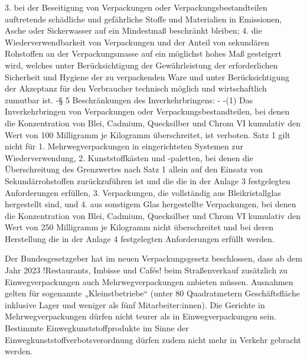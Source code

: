             3. bei der Beseitigung von Verpackungen oder Verpackungsbestandteilen auftretende schädliche und gefährliche Stoffe und Materialien in Emissionen, Asche oder Sickerwasser auf ein Mindestmaß beschränkt bleiben;
            4. die Wiederverwendbarkeit von Verpackungen und der Anteil von sekundären Rohstoffen an der Verpackungsmasse auf ein möglichst hohes Maß gesteigert wird, welches unter Berücksichtigung der Gewährleistung der erforderlichen Sicherheit und Hygiene der zu verpackenden Ware und unter Berücksichtigung der Akzeptanz für den Verbraucher technisch möglich und wirtschaftlich zumutbar ist.
    -§ 5 Beschränkungen des Inverkehrbringens:
        -%
            -(1) Das Inverkehrbringen von Verpackungen oder Verpackungsbestandteilen, bei denen die Konzentration von Blei, Cadmium, Quecksilber und Chrom VI kumulativ den Wert von 100 Milligramm je Kilogramm überschreitet, ist verboten. Satz 1 gilt nicht für 
            1. Mehrwegverpackungen in eingerichteten Systemen zur Wiederverwendung, 
            2. Kunststoffkästen und -paletten, bei denen die Überschreitung des Grenzwertes nach Satz 1 allein auf den Einsatz von Sekundärrohstoffen zurückzuführen ist und die die in der Anlage 3 festgelegten Anforderungen erfüllen, 
            3. Verpackungen, die vollständig aus Bleikristallglas hergestellt sind, und
            4. aus sonstigem Glas hergestellte Verpackungen, bei denen die Konzentration von Blei, Cadmium, Quecksilber und Chrom VI kumulativ den Wert von 250 Milligramm je Kilogramm nicht überschreitet und bei deren Herstellung die in der Anlage 4 festgelegten Anforderungen erfüllt werden.


Der Bundesgesetzgeber hat im neuen Verpackungsgesetz beschlossen, dass ab dem Jahr 2023 !Restaurants, Imbisse und Cafés! beim Straßenverkauf zusätzlich zu Einwegverpackungen auch Mehrwegverpackungen anbieten müssen. Ausnahmen gelten für sogenannte „Kleinstbetriebe“ (unter 80 Quadratmetern Geschäftsfläche inklusive Lager und weniger als fünf Mitarbeiter:innen). Die Gerichte in Mehrwegverpackungen dürfen nicht teurer als in Einwegverpackungen sein. Bestimmte Einwegkunststoffprodukte im Sinne der Einwegkunststoffverbotsverordnung dürfen zudem nicht mehr in Verkehr gebracht werden.


